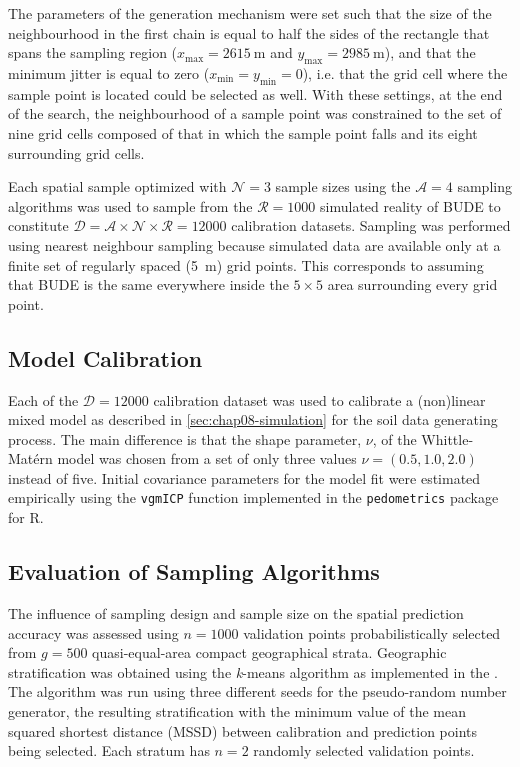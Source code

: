 The parameters of the generation mechanism were set such that the size of the neighbourhood in the first chain 
is equal to half the sides of the rectangle that spans the sampling region ($x_\text{max} = \SI{2615}{\m}$ and 
$y_\text{max} = \SI{2985}{\m}$), and that the minimum jitter is equal to zero ($x_\text{min} = y_\text{min} = 
0$), i.e. that the grid cell where the sample point is located could be selected as well. With these settings, 
at the end of the search, the neighbourhood of a sample point was constrained to the set of nine grid cells 
composed of that in which the sample point falls and its eight surrounding grid cells.

Each spatial sample optimized with $\mathcal{N} = 3$ sample sizes using the $\mathcal{A} = 4$ sampling 
algorithms was used to sample from the $\mathcal{R} = 1000$ simulated reality of BUDE to constitute 
$\mathcal{D} = \mathcal{A} \times \mathcal{N} \times \mathcal{R} = \num{12000}$ calibration datasets. Sampling 
was performed using nearest neighbour sampling because simulated data are available only at a finite set of 
regularly spaced (\SI{5}{\m}) grid points. This corresponds to assuming that BUDE is the same everywhere inside 
the $5 \times 5$ area surrounding every grid point.

\subsection{Model Calibration}

Each of the $\mathcal{D} = \num{12000}$ calibration dataset was used to calibrate a (non)linear mixed model as 
described in \autoref{sec:chap08-simulation} for the soil data generating process. The main difference is that 
the shape parameter, $\nu$, of the Whittle-Matérn model was chosen from a set of only three values $\nu = (0.5, 
1.0, 2.0)$ instead of five. Initial covariance parameters for the model fit were estimated empirically using 
the \texttt{vgmICP} function implemented in the \texttt{pedometrics} package for R.

\subsection{Evaluation of Sampling Algorithms}

The influence of sampling design and sample size on the spatial prediction accuracy was assessed using $n = 
1000$ validation points probabilistically selected from $g = 500$ quasi-equal-area compact geographical strata. 
Geographic stratification was obtained using the \textit{k}-means algorithm as implemented in the 
 \cite{WalvoortEtAl2010}. The algorithm was run using three different seeds for the 
pseudo-random number generator, the resulting stratification with the minimum value of the mean squared 
shortest distance (MSSD) between calibration and prediction points being selected. Each stratum has $n = 2$ 
randomly selected validation points.

